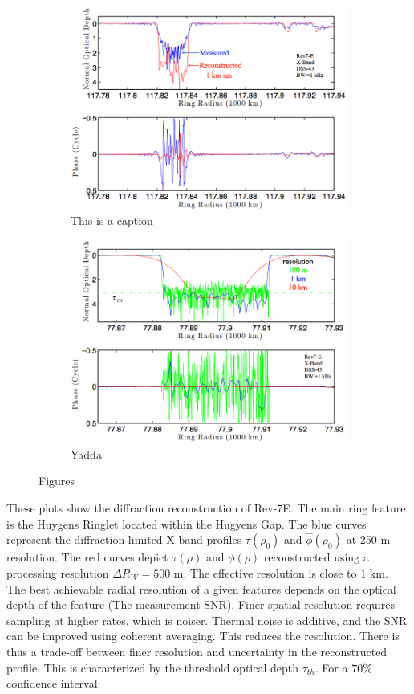 \documentclass[oneside]{book}
\theoremstyle{mystyle}
\begin{document}
\begin{figure}
	\centering
	\begin{subfigure}[b]{0.49\textwidth}
    	\includegraphics[width=\textwidth]{USER_10.png}
    	\caption{This is a caption}
    \end{subfigure}
    \begin{subfigure}[b]{0.49\textwidth}
        \includegraphics[width=\textwidth]{USER_11.png}
        \caption{Yadda}
    \end{subfigure}
    \caption{Figures}
    \label{label}
\end{figure}
These plots show the diffraction reconstruction of Rev-7E. The main ring feature is the Huygens Ringlet located within the Hugyens Gap. The blue curves represent the diffraction-limited X-band profiles $\hat{\tau}(\rho_0)$ and $\hat{\phi}(\rho_0)$ at 250 m resolution. The red curves depict $\tau(\rho)$ and $\phi(\rho)$ reconstructed using a processing resolution $\Delta R_{W} = 500$ m. The effective resolution is close to $1$ km. The best achievable radial resolution of a given features depends on the optical depth of the feature (The measurement SNR). Finer spatial resolution requires sampling at higher rates, which is noiser. Thermal noise is additive, and the SNR can be improved using coherent averaging. This reduces the resolution. There is thus a trade-off between finer resolution and uncertainty in the reconstructed profile. This is characterized by the threshold optical depth $\tau_{th}$. For a $70\%$ confidence interval:
\end{document}
